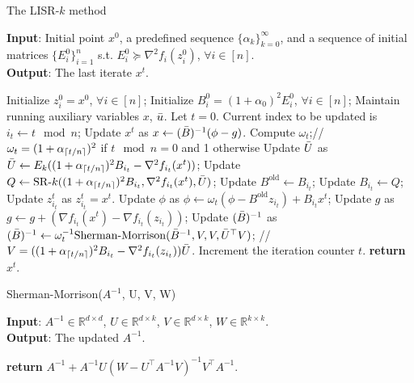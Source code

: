 \documentclass[letterpaper]{article} %
\theoremstyle{plain}
\theoremstyle{definition}
\theoremstyle{remark}
\DeclarePairedDelimiter\ceil{\lceil}{\rceil}
\def\BR{{\mathbb{R}}}
\begin{document}
\begin{algorithm}[H]
\caption{The LISR-$k$ method}
\label{alg:glins+_efficient}
\textbf{Input}: Initial point $x^0$, a predefined sequence $\{\alpha_k\}_{k=0}^{\infty}$, and a sequence of initial matrices $\{E_i^0\}_{i=1}^n$ s.t. $E_i^0 \succeq \nabla^2 f_i(z_i^0)$, $\forall i \in [n]$.\\
\textbf{Output}: The last iterate $x^t$.
\begin{algorithmic}[1] %
\STATE Initialize $z_i^0 = x^0$, $\forall i \in [n]$; Initialize $B_i^0 = (1 + \alpha_0)^2 E_i^0$, $\forall i \in [n]$;
\STATE Maintain running auxiliary variables $x$, $\Bar{u}$.
\STATE Let $t=0$.
\STATE Current index to be updated is $i_t \gets t \mod n$;
\STATE Update $x^t$ as $x \gets (\Bar{B})^{-1} (\phi - g)$.
\STATE Compute $\omega_t$;// $\omega_t = (1 + \alpha_{\ceil{t/n}})^2$ if $t \mod n = 0$ and 1 otherwise
\STATE Update $\Bar{U}$ as $\Bar{U} \gets E_k ((1 + \alpha_{\ceil{t/n}})^2 B_{i_t} - \nabla^2 f_{i_t}(x^t) )$;
\STATE Update $Q \gets  \mathrm{SR}\textrm{-}k ((1 + \alpha_{\ceil{t/n}})^2 B_{i_t}, \nabla^2 f_{i_t}(x^t), \Bar{U})$;
\STATE Update $B^{\textrm{old}} \gets B_{i_t}$;
\STATE Update $B_{i_t} \gets Q$;
\STATE Update $z_{i_t}^t$ as $z_{i_t}^t = x^t$.
\STATE Update $\phi$ as $\phi \gets \omega_t (\phi - B^{\textrm{old}} z_{i_t}) + B_{i_t} x^t$;
\STATE Update $g$ as $g \gets g + (\nabla f_{i_t} (x^t) - \nabla f_{i_t} (z_{i_t}))$;
\STATE Update $(\Bar{B})^{-1}$ as $(\Bar{B})^{-1} \gets \omega_t^{-1} \mathrm{Sherman}\textrm{-} \mathrm{Morrison}(\Bar{B}^{-1}, V,  V, \Bar{U}^{\top} V )$; // $V = ((1 + \alpha_{\ceil{t/n}})^2 B_{i_t} - \nabla^2 f_{i_t}(z_{i_t})) \Bar{U}$.
\STATE Increment the iteration counter $t$.
\ENDWHILE
\STATE \textbf{return} $x^t$.
\end{algorithmic}
\end{algorithm}

\begin{algorithm}[H]
\caption{Sherman-Morrison($A^{-1}$, U, V, W)}
\label{alg:sherman_morrison}
\textbf{Input}: $A^{-1} \in \BR^{d \times d}$, $U \in \BR^{d \times k}$, $V \in \BR^{d \times k}$, $W \in \BR^{k \times k}$.\\
\textbf{Output}: The updated $A^{-1}$.
\begin{algorithmic}[1] %
\STATE \textbf{return} $A^{-1} + A^{-1}U \left(W - U^{\top}A^{-1} V\right)^{-1} V^{\top} A^{-1}$.
\end{algorithmic}
\end{algorithm}
\end{document}
